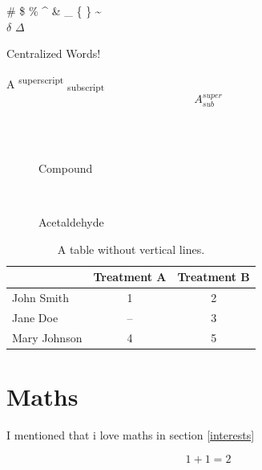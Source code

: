 \documentclass[a4paper]{report}
\begin{document}
 \#  \$  \%  \^{} \&  \_  \{  \}  \~{} \\

$\delta$ $\Delta$ %
\\

\begin{center}
{\small Centralized Words! \\}

A \textsuperscript{superscript} \textsubscript{subscript} 
$$A^{super}_{sub}$$\\
\end{center}

\begin{figure}[!htbp]
	\centering
	 \\
	\caption{ Compound}
\end{figure}


\begin{figure}[!htbp]
	\centering
	 \\
	\caption{Acetaldehyde}
\end{figure}

\begin{table}[!thbp]
	\centering
	\caption{A table without vertical lines.}
	\begin{tabular}{lcc}
		\toprule
		&Treatment A&Treatment B\\
		\hline
		John Smith&1&2\\
		Jane Doe&--&3\\
		Mary Johnson&4&5\\
		\bottomrule
	\end{tabular}
\end{table}

\newpage
\chapter{Maths}
I mentioned that i love maths in section \ref{interests}

\begin{equation}
1+1=2
\end{equation}
\end{document}
